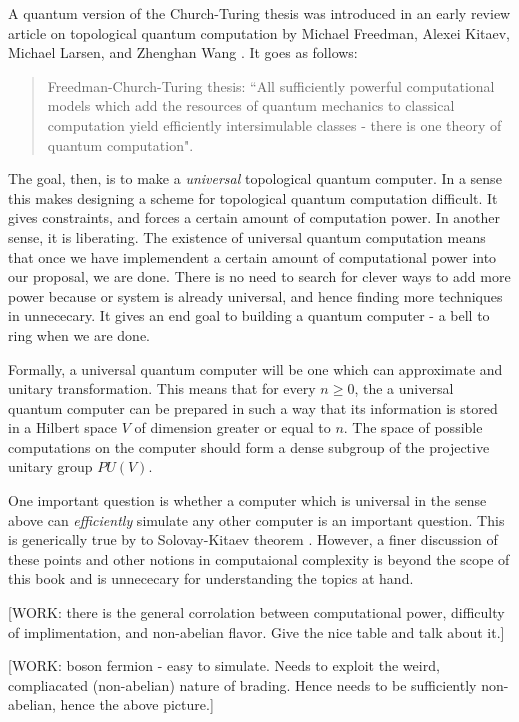 A quantum version of the Church-Turing thesis was introduced in an early review article on topological quantum computation by Michael Freedman, Alexei Kitaev, Michael Larsen, and Zhenghan Wang \cite{freedman2003topological}. It goes as follows:

\begin{quote}
Freedman-Church-Turing thesis: ``All sufficiently powerful computational models which add the resources of quantum mechanics to classical computation yield efficiently intersimulable classes - there is one theory of quantum computation".
\end{quote}


The goal, then, is to make a \textit{universal} topological quantum computer. In a sense this makes designing a scheme for topological quantum computation difficult. It gives constraints, and forces a certain amount of computation power. In another sense, it is liberating. The existence of universal quantum computation means that once we have implemendent a certain amount of computational power into our proposal, we are done. There is no need to search for clever ways to add more power because or system is already universal, and hence finding more techniques in unnececary. It gives an end goal to building a quantum computer - a bell to ring when we are done.

Formally, a universal quantum computer will be one which can approximate and unitary transformation. This means that for every $n\geq 0$, the a universal quantum computer can be prepared in such a way that its information is stored in a Hilbert space $V$ of dimension greater or equal to $n$. The space of possible computations on the computer should form a dense subgroup of the projective unitary group $PU(V)$.

One important question is whether a computer which is universal in the sense above can \textit{efficiently} simulate any other computer is an important question. This is generically true by to Solovay-Kitaev theorem \cite{kitaev1997quantum, nielsen2010quantum}. However, a finer discussion of these points and other notions in computaional complexity is beyond the scope of this book and is unnececary for understanding the topics at hand.

[WORK: there is the general corrolation between computational power, difficulty of implimentation, and non-abelian flavor. Give the nice table and talk about it.]

[WORK: boson fermion - easy to simulate. Needs to exploit the weird, compliacated (non-abelian) nature of brading. Hence needs to be sufficiently non-abelian, hence the above picture.]


